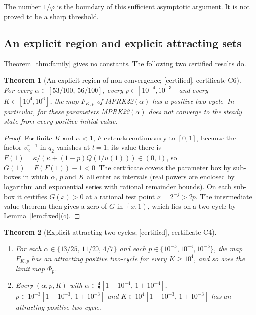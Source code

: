 \documentclass[11pt,a4paper]{article}
\theoremstyle{plain}
\newtheorem{theorem}{Theorem}
\theoremstyle{definition}
\newcommand{\status}[1]{\textsf{[#1]}}
\begin{document}
The number $1/\varphi$ is the boundary of this sufficient asymptotic argument. It is not proved to be a sharp threshold.

\subsection{An explicit region and explicit attracting sets}

Theorem~\ref{thm:family} gives no constants. The following two certified results do.

\begin{theorem}[An explicit region of non-convergence; \status{certified}, certificate C6]\label{thm:region}
For every $\alpha\in[53/100,\,56/100]$, every $p\in[10^{-4},10^{-3}]$ and every $K\in[10^4,10^6]$, the map $F_{K,p}$ of MPRK22$(\alpha)$ has a positive two-cycle. In particular, for these parameters MPRK22$(\alpha)$ does not converge to the steady state from every positive initial value.
\end{theorem}

\begin{proof}
For finite $K$ and $\alpha<1$, $F$ extends continuously to $[0,1]$, because the factor $v_2^{r-1}$ in $q_2$ vanishes at $t=1$; its value there is $F(1)=\kappa/(\kappa+(1-p)Q(1/u(1)))\in(0,1)$, so $G(1)=F(F(1))-1<0$. The certificate covers the parameter box by sub-boxes in which $\alpha$, $p$ and $K$ all enter as intervals (real powers are enclosed by logarithm and exponential series with rational remainder bounds). On each sub-box it certifies $G(x)>0$ at a rational test point $x=2^{-j}>2p$. The intermediate value theorem then gives a zero of $G$ in $(x,1)$, which lies on a two-cycle by Lemma~\ref{lem:fixed}(c).
\end{proof}

\begin{theorem}[Explicit attracting two-cycles; \status{certified}, certificate C4]\label{thm:attracting}
\begin{enumerate}[label=(\alph*),itemsep=1pt]
\item For each $\alpha\in\{13/25,\,11/20,\,4/7\}$ and each $p\in\{10^{-3},10^{-4},10^{-5}\}$, the map $F_{K,p}$ has an attracting positive two-cycle for \emph{every} $K\ge10^4$, and so does the limit map $\Phi_p$.
\item Every $(\alpha,p,K)$ with $\alpha\in\frac47[1-10^{-4},\,1+10^{-4}]$, $p\in10^{-3}[1-10^{-3},\,1+10^{-3}]$ and $K\in10^4[1-10^{-3},\,1+10^{-3}]$ has an attracting positive two-cycle.
\end{enumerate}
\end{theorem}
\end{document}
